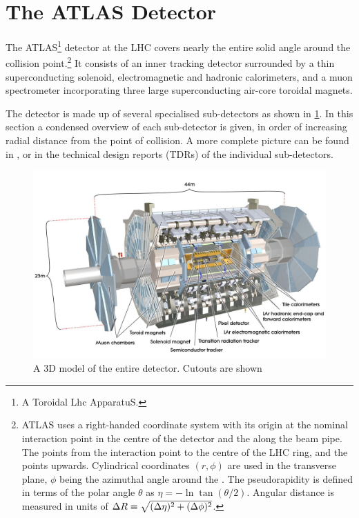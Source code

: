 \section{The ATLAS Detector}\label{sec:atlas_detector}
\newcommand{\AtlasCoordFootnote}{%
ATLAS uses a right-handed coordinate system with its origin at the nominal interaction point in the centre of the detector and the \axis{z} along the beam pipe. The \axis{x} points from the interaction point to the centre of the LHC ring, and the \axis{y} points upwards. Cylindrical coordinates \((r,\phi)\) are used in the transverse plane, \(\phi\) being the azimuthal angle around the \axis{z}. The pseudorapidity is defined in terms of the polar angle \(\theta\) as \(\eta = -\ln \tan(\theta/2)\). Angular distance is measured in units of \(\DeltaR \equiv \sqrt{(\Delta\eta)^{2} + (\Delta\phi)^{2}}\).}

The ATLAS\footnote{A Toroidal Lhc ApparatuS.} detector at the LHC covers nearly the entire solid angle around the collision point.\footnote{\AtlasCoordFootnote}
It consists of an inner tracking detector surrounded by a thin superconducting solenoid, electromagnetic and hadronic calorimeters,
and a muon spectrometer incorporating three large superconducting air-core toroidal magnets.

The detector is made up of several specialised sub-detectors as shown in \cref{fig:atlas_detector}.
In this section a condensed overview of each sub-detector is given, in order of increasing radial distance from the point of collision.
A more complete picture can be found in , or in the technical design reports (TDRs) of the individual sub-detectors.

\begin{figure}[!htpb]
  \centering
  \includegraphics[width=0.9\linewidth]{chapters/2.detector/figs/atlas_detector.jpg}
  \caption{A 3D model of the entire \ATLAS detector. Cutouts are shown}
  \label{fig:atlas_detector}
\end{figure}
%


